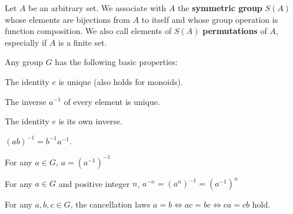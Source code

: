 \begin{definition}\label{def:symmetric_group}
  Let \( A \) be an arbitrary set. We associate with \( A \) the \textbf{symmetric group} \( S(A) \) whose elements are bijections from \( A \) to itself and whose group operation is function composition. We also call elements of \( S(A) \) \textbf{permutations} of \( A \), especially if \( A \) is a finite set.
\end{definition}

\begin{proposition}\label{def:group_properties}
  Any group \( G \) has the following basic properties:
  \begin{defenum}
    \item\label{def:group_properties/unique_identity} The identity \( e \) is unique (also holds for monoids).
    \item\label{def:group_properties/unique_inverse} The inverse \( a^{-1} \) of every element is unique.
    \item\label{def:group_properties/identity_inverse} The identity \( e \) is its own inverse.
    \item\label{def:group_properties/inverse_composition} \( (ab)^{-1} = b^{-1} a^{-1} \).
    \item\label{def:group_properties/double_inverse} For any \( a \in G \), \( a = (a^{-1})^{-1} \)
    \item\label{def:group_properties/negative_power} For any \( a \in G \) and positive integer \( n \), \( a^{-n} = (a^n)^{-1} = (a^{-1})^n \)
    \item\label{def:group_properties/cancellation} For any \( a, b, c \in G \), the cancellation laws \( a = b \iff ac = bc \iff ca = cb \) hold.
  \end{defenum}
\end{proposition}
